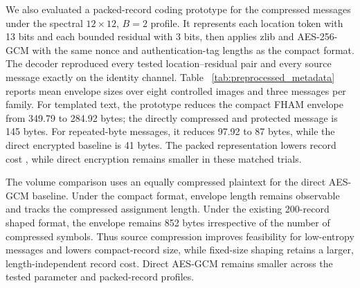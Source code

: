 \documentclass[preprint,12pt]{elsarticle}
\theoremstyle{plain}
\providecommand{\DIFaddtex}[1]{{\protect\color{blue} \sf #1}} %
\providecommand{\DIFdeltex}[1]{{\protect\color{red} \scriptsize #1}} %
\providecommand{\DIFaddbegin}{} %
\providecommand{\DIFaddend}{} %
\providecommand{\DIFdelbegin}{} %
\providecommand{\DIFdelend}{} %
\providecommand{\DIFaddFL}[1]{\DIFadd{#1}} %
\providecommand{\DIFdelFL}[1]{\DIFdel{#1}} %
\providecommand{\DIFaddbeginFL}{} %
\providecommand{\DIFaddendFL}{} %
\providecommand{\DIFdelbeginFL}{} %
\providecommand{\DIFdelendFL}{} %
\providecommand{\DIFadd}[1]{\texorpdfstring{\DIFaddtex{#1}}{#1}} %
\providecommand{\DIFdel}[1]{\texorpdfstring{\DIFdeltex{#1}}{}} %
\providecommand{\DIFscaledelfig}{0.5}
\newlength{\DIFdelgraphicswidth} %
\newlength{\DIFdelgraphicsheight} %
\providecommand{\DIFaddincludegraphics}[2][]{{\color{blue}\fbox{\DIFOincludegraphics[#1]{#2}}}} %
\providecommand{\DIFdelincludegraphics}[2][]{%
\sbox{\DIFdelgraphicsbox}{\DIFOincludegraphics[#1]{#2}}%
\settoboxwidth{\DIFdelgraphicswidth}{\DIFdelgraphicsbox} %
\settoboxtotalheight{\DIFdelgraphicsheight}{\DIFdelgraphicsbox} %
\scalebox{\DIFscaledelfig}{%
\parbox[b]{\DIFdelgraphicswidth}{\usebox{\DIFdelgraphicsbox}\\[-\baselineskip] \rule{\DIFdelgraphicswidth}{0em}}\llap{\resizebox{\DIFdelgraphicswidth}{\DIFdelgraphicsheight}{%
\setlength{\unitlength}{\DIFdelgraphicswidth}%
\begin{picture}(1,1)%
\thicklines\linethickness{2pt} %
{\color[rgb]{1,0,0}\put(0,0){\framebox(1,1){}}}%
{\color[rgb]{1,0,0}\put(0,0){\line( 1,1){1}}}%
{\color[rgb]{1,0,0}\put(0,1){\line(1,-1){1}}}%
\end{picture}%
}\hspace*{3pt}}} %
} %
\DeclareRobustCommand{\DIFaddbegin}{\DIFOaddbegin \let\includegraphics\DIFaddincludegraphics} %
\DeclareRobustCommand{\DIFaddend}{\DIFOaddend \let\includegraphics\DIFOincludegraphics} %
\DeclareRobustCommand{\DIFdelbegin}{\DIFOdelbegin \let\includegraphics\DIFdelincludegraphics} %
\DeclareRobustCommand{\DIFdelend}{\DIFOaddend \let\includegraphics\DIFOincludegraphics} %
\DeclareRobustCommand{\DIFaddbeginFL}{\DIFOaddbeginFL \let\includegraphics\DIFaddincludegraphics} %
\DeclareRobustCommand{\DIFaddendFL}{\DIFOaddendFL \let\includegraphics\DIFOincludegraphics} %
\DeclareRobustCommand{\DIFdelbeginFL}{\DIFOdelbeginFL \let\includegraphics\DIFdelincludegraphics} %
\DeclareRobustCommand{\DIFdelendFL}{\DIFOaddendFL \let\includegraphics\DIFOincludegraphics} %
\renewcommand{\DIFdel}[1]{}
\renewcommand{\DIFdelFL}[1]{}
\renewcommand{\DIFdelincludegraphics}[2][]{}
\begin{document}
\begin{table}[!t]
\centering
\small
\caption{Compact record size for the controlled 200-character cohort under $B=2$ \DIFdelbeginFL \DIFdelFL{, without pre-assignment }\DIFdelendFL \DIFaddbeginFL \DIFaddFL{with an uncompressed }\DIFaddendFL source \DIFdelbeginFL \DIFdelFL{compression}\DIFdelendFL \DIFaddbeginFL \DIFaddFL{message}\DIFaddendFL .}
\label{tab:channel_bounded}

\end{table}

We also evaluated a packed-record coding prototype for the compressed
messages under the spectral $12\times12$, $B=2$ profile. It represents each
location token with 13 bits and each bounded residual with 3 bits, then applies
zlib and AES-256-GCM with the same nonce and authentication-tag lengths as the
compact format. The decoder reproduced every tested location--residual pair
and every source message exactly on the identity channel. Table
~\ref{tab:preprocessed_metadata} reports mean envelope sizes over eight
controlled images and three messages per family. For templated text, the
prototype reduces the compact FHAM envelope from 349.79 to 284.92 bytes; the
directly compressed and protected message is 145 bytes. For repeated-byte
messages, it reduces 97.92 to 87 bytes, while the direct encrypted baseline is
41 bytes. The packed representation \DIFdelbegin \DIFdel{therefore }\DIFdelend lowers record cost\DIFdelbegin \DIFdel{but does not
make FHAM smaller than direct
encryption }\DIFdelend \DIFaddbegin \DIFadd{, while direct
encryption remains smaller }\DIFaddend in these matched trials.

\begin{table}[!t]
\centering
\small
\caption{Protected Metadata after Lossless Message Compression (Bytes)}
\label{tab:preprocessed_metadata}
\resizebox{\linewidth}{!}{}
\end{table}

The volume comparison uses an equally compressed plaintext for the direct
AES-GCM baseline. Under the compact format, envelope length remains observable
and tracks the compressed assignment length. Under the existing 200-record
shaped format, the envelope remains 852 bytes irrespective of the number of
compressed symbols. Thus source compression improves feasibility for
low-entropy messages and lowers compact-record size, while fixed-size shaping
retains a larger, length-independent record cost. \DIFdelbegin \DIFdel{Neither parameter tuning nor
the }\DIFdelend \DIFaddbegin \DIFadd{Direct AES-GCM remains
smaller across the tested parameter and }\DIFaddend packed-record \DIFdelbegin \DIFdel{prototype reverses the measured direct-encryption volume
advantage}\DIFdelend \DIFaddbegin \DIFadd{profiles}\DIFaddend .
\end{document}
